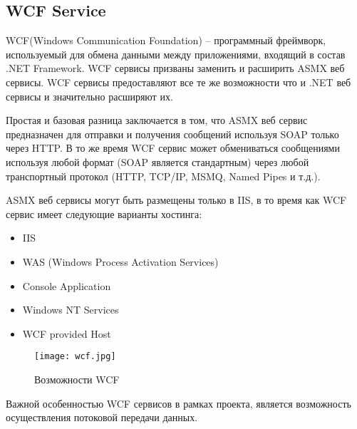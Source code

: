 \subsection{WCF Service}

WCF(Windows Communication Foundation) – программный фреймворк, используемый для обмена данными между приложениями, входящий в состав .NET Framework. WCF сервисы призваны заменить и расширить ASMX веб сервисы. WCF сервисы предоставляют все те же возможности что и .NET веб сервисы и значительно расширяют их.

Простая и базовая разница заключается в том, что ASMX веб сервис предназначен для отправки и получения сообщений используя SOAP только через HTTP. В то же время WCF сервис может обмениваться сообщениями используя любой формат (SOAP является стандартным) через любой транспортный протокол (HTTP, TCP/IP, MSMQ, Named Pipes и т.д.).

ASMX веб сервисы могут быть размещены только в IIS, в то время как WCF сервис имеет следующие варианты хостинга:
\begin{itemize}
	\item IIS
	\item WAS (Windows Process Activation Services)
	\item Console Application
	\item Windows NT Services
	\item WCF provided Host
\end{itemize}

\begin{figure}[h!]
\centering
	\texttt{[image: wcf.jpg]}
	\caption{Возможности WCF}
\end{figure}

Важной особенностью WCF сервисов в рамках проекта, является возможность осуществления потоковой передачи данных.